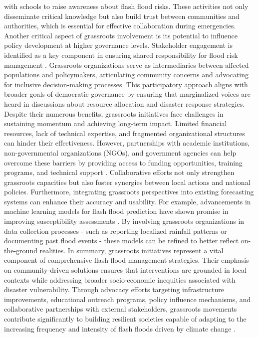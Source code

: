 with schools to raise awareness about flash flood risks. These activities not only disseminate critical knowledge but also build trust between communities and authorities, which is essential for effective collaboration during emergencies. Another critical aspect of grassroots involvement is its potential to influence policy development at higher governance levels. Stakeholder engagement is identified as a key component in ensuring shared responsibility for flood risk management \citep{Saad2024}. Grassroots organizations serve as intermediaries between affected populations and policymakers, articulating community concerns and advocating for inclusive decision-making processes. This participatory approach aligns with broader goals of democratic governance by ensuring that marginalized voices are heard in discussions about resource allocation and disaster response strategies. Despite their numerous benefits, grassroots initiatives face challenges in sustaining momentum and achieving long-term impact. Limited financial resources, lack of technical expertise, and fragmented organizational structures can hinder their effectiveness. However, partnerships with academic institutions, non-governmental organizations (NGOs), and government agencies can help overcome these barriers by providing access to funding opportunities, training programs, and technical support \citep{Ngo2018}\citep{Terti2015}. Collaborative efforts not only strengthen grassroots capacities but also foster synergies between local actions and national policies. Furthermore, integrating grassroots perspectives into existing forecasting systems can enhance their accuracy and usability. For example, advancements in machine learning models for flash flood prediction have shown promise in improving susceptibility assessments \citep{Ngo2018}. By involving grassroots organizations in data collection processes - such as reporting localized rainfall patterns or documenting past flood events - these models can be refined to better reflect on-the-ground realities. In summary, grassroots initiatives represent a vital component of comprehensive flash flood management strategies. Their emphasis on community-driven solutions ensures that interventions are grounded in local contexts while addressing broader socio-economic inequities associated with disaster vulnerability. Through advocacy efforts targeting infrastructure improvements, educational outreach programs, policy influence mechanisms, and collaborative partnerships with external stakeholders, grassroots movements contribute significantly to building resilient societies capable of adapting to the increasing frequency and intensity of flash floods driven by climate change \citep{AlRawas2024}\citep{Abegaz2024}\citep{Kastridis2020}\citep{Saad2024}.

